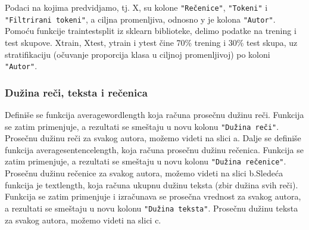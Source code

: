 \documentclass{article}
\begin{document}
\begin{flushleft}
\newpage

Podaci na kojima predvidjamo, tj. X, su kolone \verb|"Rečenice"|, \verb|"Tokeni"| i
\verb|"Filtrirani tokeni"|, a ciljna promenljiva, odnosno y je kolona 
\verb|"Autor"|. Pomoću funkcije train\textunderscore test\textunderscore split iz sklearn biblioteke, delimo podatke na trening i test skupove. X\textunderscore train, X\textunderscore test, y\textunderscore train i y\textunderscore test čine 70\% trening i 30\% test skupa, uz stratifikaciju (očuvanje proporcija klasa u ciljnoj promenljivoj) po koloni \verb|"Autor"|.

\vspace{3.5mm}


\subsubsection{Dužina reči, teksta i rečenica}

Definiše se funkcija average\textunderscore word\textunderscore length
koja računa prosečnu dužinu reči. Funkcija se zatim primenjuje, a rezultati se 
smeštaju u novu kolonu \verb|"Dužina reči"|. Prosečnu dužinu reči za svakog autora, možemo videti na slici a. Dalje se definiše funkcija average\textunderscore sentence\textunderscore length, koja računa prosečnu dužinu rečenica. Funkcija se zatim primenjuje, a rezultati se smeštaju u novu kolonu \verb|"Dužina rečenice"|. Prosečnu dužinu rečenice za svakog autora, možemo videti na slici b.Sledeća funkcija je text\textunderscore length, koja računa ukupnu dužinu teksta (zbir dužina svih reči). Funkcija se zatim primenjuje i izračunava se prosečna vrednost za svakog autora, a rezultati se smeštaju u novu kolonu \verb|"Dužina teksta"|. Prosečnu dužinu teksta za svakog autora, možemo videti na slici c.




\end{flushleft}
\end{document}
